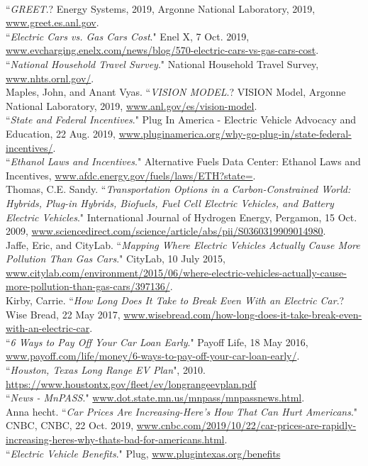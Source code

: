\documentclass[answers]{exam}
\begin{document}
\begin{thebibliography}{99}
\\
 ``\textit{GREET}.? Energy Systems, 2019, Argonne National Laboratory, 2019, 
\url{www.greet.es.anl.gov}.
\\
``\textit{Electric Cars vs. Gas Cars Cost}." Enel X, 7 Oct. 2019, \url{www.evcharging.enelx.com/news/blog/570-electric-cars-vs-gas-cars-cost}.
\\
``\textit{National Household Travel Survey}." National Household Travel Survey, \url{www.nhts.ornl.gov/}.
\\
 Maples, John, and Anant Vyas. ``\textit{VISION MODEL}.? VISION Model, Argonne National Laboratory, 2019, 
\url{www.anl.gov/es/vision-model}.
\\
``\textit{State and Federal Incentives}." Plug In America - Electric Vehicle Advocacy and Education, 22 Aug. 2019, \url{www.pluginamerica.org/why-go-plug-in/state-federal-incentives/}.
\\
``\textit{Ethanol Laws and Incentives}." Alternative Fuels Data Center: Ethanol Laws and Incentives, \url{www.afdc.energy.gov/fuels/laws/ETH?state=}.
\\
Thomas, C.E. Sandy. ``\textit{Transportation Options in a Carbon-Constrained World: Hybrids, Plug-in Hybrids, Biofuels, Fuel Cell Electric Vehicles, and Battery Electric Vehicles}." International Journal of Hydrogen Energy, Pergamon, 15 Oct. 2009, \url{www.sciencedirect.com/science/article/abs/pii/S0360319909014980}.
\\
 Jaffe, Eric, and CityLab. ``\textit{Mapping Where Electric Vehicles Actually Cause More Pollution Than Gas Cars}." CityLab, 10 July 2015, \url{www.citylab.com/environment/2015/06/where-electric-vehicles-actually-cause-more-pollution-than-gas-cars/397136/}.
\\
 Kirby, Carrie. ``\textit{How Long Does It Take to Break Even With an Electric Car}.? Wise Bread, 22 May 2017, \url{www.wisebread.com/how-long-does-it-take-break-even-with-an-electric-car}.
\\
 ``\textit{6 Ways to Pay Off Your Car Loan Early}." Payoff Life, 18 May 2016, \url{www.payoff.com/life/money/6-ways-to-pay-off-your-car-loan-early/}.
\\
``\textit{Houston, Texas Long Range EV Plan}", 2010. \url{https://www.houstontx.gov/fleet/ev/longrangeevplan.pdf}
\\
``\textit{News - MnPASS}." \url{www.dot.state.mn.us/mnpass/mnpassnews.html}.
\\
Anna hecht. ``\textit{Car Prices Are Increasing-Here's How That Can Hurt Americans}." CNBC, CNBC, 22 Oct. 2019, \url{www.cnbc.com/2019/10/22/car-prices-are-rapidly-increasing-heres-why-thats-bad-for-americans.html}.
\\
``\textit{Electric Vehicle Benefits}." Plug, \url{www.plugintexas.org/benefits}

\end{thebibliography}
\end{document}
